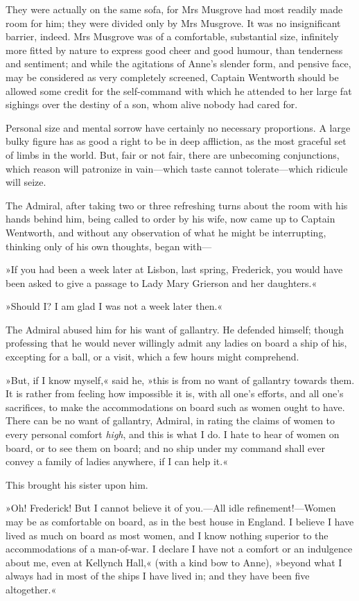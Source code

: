 They were actually on the same sofa, for Mrs Musgrove had most readily made room for him; they were divided only by Mrs Musgrove. It was no insignificant barrier, indeed. Mrs Musgrove was of a comfortable, substantial size, infinitely more fitted by nature to express good cheer and good humour, than tenderness and sentiment; and while the agitations of Anne's slender form, and pensive face, may be considered as very completely screened, Captain Wentworth should be allowed some credit for the self-command with which he attended to her large fat sighings over the destiny of a son, whom alive nobody had cared for.

Personal size and mental sorrow have certainly no necessary proportions. A large bulky figure has as good a right to be in deep affliction, as the most graceful set of limbs in the world. But, fair or not fair, there are unbecoming conjunctions, which reason will patronize in vain—which taste cannot tolerate—which ridicule will seize.

The Admiral, after taking two or three refreshing turns about the room with his hands behind him, being called to order by his wife, now came up to Captain Wentworth, and without any observation of what he might be interrupting, thinking only of his own thoughts, began with—

»If you had been a week later at Lisbon, last spring, Frederick, you would have been asked to give a passage to Lady Mary Grierson and her daughters.«

»Should I? I am glad I was not a week later then.«

The Admiral abused him for his want of gallantry. He defended himself; though professing that he would never willingly admit any ladies on board a ship of his, excepting for a ball, or a visit, which a few hours might comprehend.

»But, if I know myself,« said he, »this is from no want of gallantry towards them. It is rather from feeling how impossible it is, with all one's efforts, and all one's sacrifices, to make the accommodations on board such as women ought to have. There can be no want of gallantry, Admiral, in rating the claims of women to every personal comfort \textit{high}, and this is what I do. I hate to hear of women on board, or to see them on board; and no ship under my command shall ever convey a family of ladies anywhere, if I can help it.«

This brought his sister upon him.

»Oh! Frederick! But I cannot believe it of you.—All idle refinement!—Women may be as comfortable on board, as in the best house in England. I believe I have lived as much on board as most women, and I know nothing superior to the accommodations of a man-of-war. I declare I have not a comfort or an indulgence about me, even at Kellynch Hall,« (with a kind bow to Anne), »beyond what I always had in most of the ships I have lived in; and they have been five altogether.«

